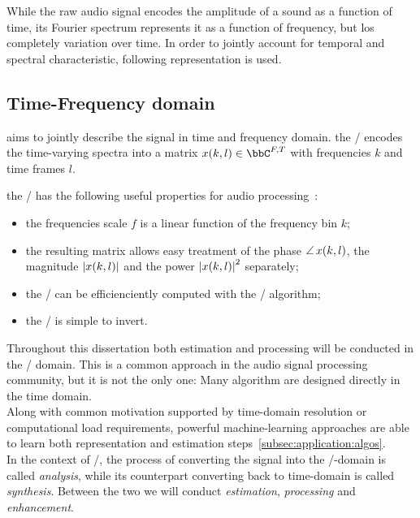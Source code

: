 %
%


While the raw audio signal encodes the amplitude of a sound as a function of time,
its Fourier spectrum represents it as a function of frequency, but los completely variation over time.
In order to jointly account for temporal and spectral characteristic, following representation is used.

\subsection{Time-Frequency domain}
 aims to jointly describe the signal in time and frequency domain.
the \STFTdef/ encodes the time-varying spectra into a matrix $x(k,l) \in \bbC^{F,T}$ with frequencies $k$ and time frames $l$.

the \STFT/ has the following useful properties for audio processing~\cite{vincent2018audio}:
\begin{itemize}
    \item the frequencies scale $f$ is a linear function of the frequency bin $k$;
    \item the resulting matrix allows easy treatment of
          the phase $\operatorname*{\angle}{x(k,l)}$, the magnitude $\magnitudeOf{x(k,l)}$ and the power $\powerOf{x(k,l)}$ separately;
    \item the \DFT/ can be efficienciently computed with the \FFT/ algorithm;
    \item the \STFT/ is simple to invert.
\end{itemize}

Throughout this dissertation both estimation and processing will be conducted in the  \TF/ domain.
This is a common approach in the audio signal processing community, but it is not the only one:
Many algorithm are designed directly in the time domain.
\\Along with common motivation supported by time-domain resolution or computational load requirements,
powerful machine-learning approaches are able to learn both representation and estimation steps~\cref{subsec:application:algos}.
\\In the context of \STFT/, the process of converting the signal into the \TF/-domain is called \textit{analysis}, while
its counterpart converting back to time-domain is called \textit{synthesis}.
Between the two we will conduct \textit{estimation}, \textit{processing} and \textit{enhancement}.


